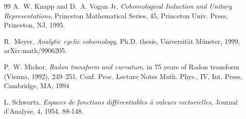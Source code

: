 \documentclass[12pt, a4paper]{amsart}
\theoremstyle{Theorem}
\theoremstyle{Theorem}
\theoremstyle{Theorem}
\theoremstyle{Theorem}
\theoremstyle{Plain}
\theoremstyle{remark}
\theoremstyle{remark}
\theoremstyle{Definition}
\numberwithin{equation}{section}
\begin{document}
\begin{thebibliography}{99}
 A.~W. Knapp and D.~A. Vogan Jr, \textit{Cohomological Induction and Unitary Representations}, Princeton Mathematical Series, 45, Princeton Univ. Press, Princeton, NJ, 1995.

R.~Meyer,
\textit{Analytic cyclic cohomology},
Ph.D. thesis, Universit\"at M\"unster, 1999,
arXiv:math/9906205.



P.~W. Michor, \textit{Radon transform and curvature}, in 75 years of Radon transform (Vienna, 1992), 249--251, Conf. Proc. Lecture Notes Math. Phys., IV, Int. Press, Cambridge, MA, 1994




%




 L. Schwartz, \textit{Espaces de fonctions diff\'erentiables \`a valeurs vectorielles}, Journal d'Analyse, 4, 1954,
88-148.




\end{thebibliography}
\end{document}
